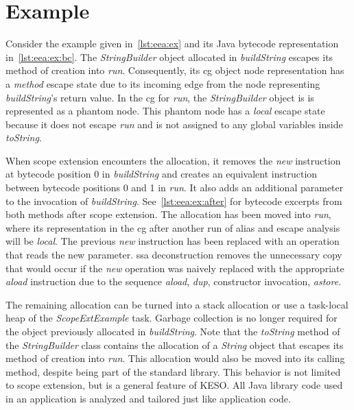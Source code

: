 	\section{Example}
		\label{sec:eea:ex}
		Consider the example given in~\cref{lst:eea:ex} and its Java bytecode representation in~\cref{lst:eea:ex:bc}. The
		\emph{StringBuilder} object allocated in \emph{buildString} escapes its method of creation into \emph{run}.
		Consequently, its \gls{cg} object node representation has a \emph{method} escape state due to its incoming edge from
		the node representing \emph{buildString}'s return value. In the \acrlong{cg} for \emph{run}, the
		\emph{StringBuilder} object is is represented as a phantom node. This phantom node has a \emph{local} escape state
		because it does not escape \emph{run} and is not assigned to any global variables inside \emph{toString}.


		When scope extension encounters the allocation, it removes the \emph{new} instruction at bytecode position 0 in
		\emph{buildString} and creates an equivalent instruction between bytecode positions 0 and
		1 in \emph{run}. It also adds an additional parameter to the invocation of \emph{buildString}.
		See~\cref{lst:eea:ex:after} for bytecode excerpts from both methods after scope extension. The allocation has been
		moved into \emph{run}, where its representation in the \gls{cg} after another run of alias and escape analysis will
		be \emph{local}. The previous \emph{new} instruction has been replaced with an operation that reads the new
		parameter. \Gls{ssa} deconstruction removes the unnecessary copy that would occur if the \emph{new} operation was
		naively replaced with the appropriate \emph{aload} instruction due to the sequence \emph{aload}, \emph{dup},
		constructor invocation, \emph{astore}.

		The remaining allocation can be turned into a stack allocation or use a task-local heap of the
		\emph{ScopeExtExample} task. Garbage collection is no longer required for the object previously allocated in
		\emph{buildString}. Note that the \emph{toString} method of the \emph{StringBuilder} class contains the allocation
		of a \emph{String} object that escapes its method of creation into \emph{run}. This allocation would also be moved
		into its calling method, despite being part of the standard library. This behavior is not limited to scope
		extension, but is a general feature of KESO\@. All Java library code used in an application is analyzed and tailored
		just like application code.
